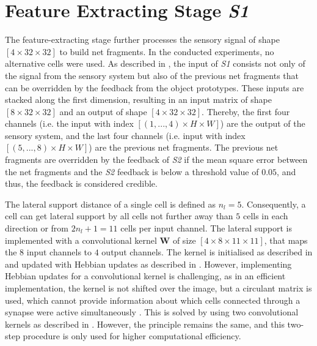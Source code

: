 \section{Feature Extracting Stage \emph{S1}}
The feature-extracting stage further processes the sensory signal of shape $[4 \times 32 \times 32]$ to build net fragments. In the conducted experiments, no alternative cells were used. As described in , the input of \emph{S1} consists not only of the signal from the sensory system but also of the previous net fragments that can be overridden by the feedback from the object prototypes.
These inputs are stacked along the first dimension, resulting in an input matrix of shape $[8 \times 32 \times 32]$ and an output of shape $[4 \times 32 \times 32]$.
Thereby, the first four channels (i.e. the input with index $[(1, ..., 4) \times H \times W]$) are the output of the sensory system, and the last four channels (i.e. input with index $[(5, ..., 8) \times H \times W]$) are the previous net fragments.
The previous net fragments are overridden by the feedback of \emph{S2} if the mean square error between the net fragments and the \emph{S2} feedback is below a threshold value of $0.05$, and thus, the feedback is considered credible.

The lateral support distance of a single cell is defined as $n_l=5$. Consequently, a cell can get lateral support by all cells not further away than $5$ cells in each direction or from $2n_l+1=11$ cells per input channel.
The lateral support is implemented with a convolutional kernel $\boldsymbol{W}$ of size $[4 \times 8 \times 11 \times 11]$, that maps the $8$ input channels to $4$ output channels.
The kernel is initialised as described in  and updated with Hebbian updates as described in .
However, implementing Hebbian updates for a convolutional kernel is challenging, as in an efficient implementation, the kernel is not shifted over the image, but a circulant matrix is used, which cannot provide information about which cells connected through a synapse were active simultaneously . This is solved by using two convolutional kernels as described in . However, the principle remains the same, and this two-step procedure is only used for higher computational efficiency.

